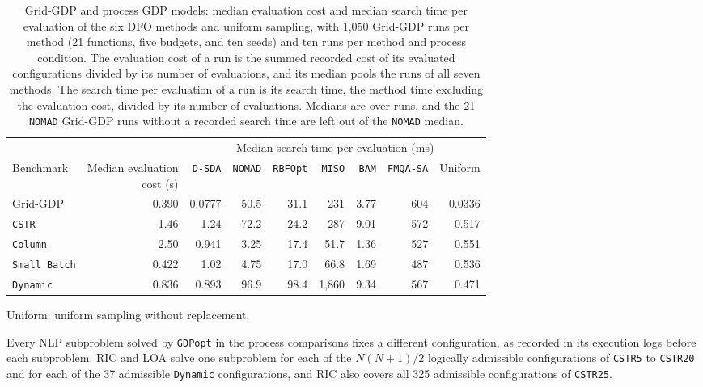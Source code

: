 \begin{table}[htbp]
\centering
\caption{Grid-GDP and process GDP models: median evaluation cost and median search time per evaluation of the six DFO methods and uniform sampling, with 1,050 Grid-GDP runs per method (21 functions, five budgets, and ten seeds) and ten runs per method and process condition.
The evaluation cost of a run is the summed recorded cost of its evaluated configurations divided by its number of evaluations, and its median pools the runs of all seven methods.
The search time per evaluation of a run is its search time, the method time excluding the evaluation cost, divided by its number of evaluations.
Medians are over runs, and the 21 \texttt{NOMAD} Grid-GDP runs without a recorded search time are left out of the \texttt{NOMAD} median.}
\label{tab:supp-overhead}
\footnotesize
\setlength{\tabcolsep}{3.5pt}
\begin{threeparttable}
\begin{tabular}{@{}lrrrrrrrr@{}}\toprule
 & & \multicolumn{7}{c}{Median search time per evaluation (ms)}\\\cmidrule(l){3-9}
Benchmark & \makecell{Median evaluation\\cost (s)} & \texttt{D-SDA} & \texttt{NOMAD} & \texttt{RBFOpt} & \texttt{MISO} & \texttt{BAM} & \texttt{FMQA-SA} & Uniform\\\midrule
Grid-GDP & 0.390 & 0.0777 & 50.5 & 31.1 & 231 & 3.77 & 604 & 0.0336 \\
\midrule
\texttt{CSTR} & 1.46 & 1.24 & 72.2 & 24.2 & 287 & 9.01 & 572 & 0.517 \\
\texttt{Column} & 2.50 & 0.941 & 3.25 & 17.4 & 51.7 & 1.36 & 527 & 0.551 \\
\texttt{Small Batch} & 0.422 & 1.02 & 4.75 & 17.0 & 66.8 & 1.69 & 487 & 0.536 \\
\texttt{Dynamic} & 0.836 & 0.893 & 96.9 & 98.4 & 1{,}860 & 9.34 & 567 & 0.471 \\
\bottomrule
\end{tabular}
\begin{tablenotes}[flushleft]\footnotesize
\item Uniform: uniform sampling without replacement.
\end{tablenotes}
\end{threeparttable}
\end{table}

Every NLP subproblem solved by \texttt{GDPopt} in the process comparisons fixes a different configuration, as recorded in its execution logs before each subproblem.
RIC and LOA solve one subproblem for each of the \(N(N+1)/2\) logically admissible configurations of \texttt{CSTR5} to \texttt{CSTR20} and for each of the 37 admissible \texttt{Dynamic} configurations, and RIC also covers all 325 admissible configurations of \texttt{CSTR25}.
\FloatBarrier

